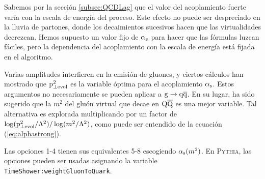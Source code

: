 Sabemos por la sección \ref{subsec:QCDLag} que el valor del acoplamiento fuerte varía con la escala de energía del proceso. Este efecto no puede ser despreciado en la lluvia de partones, donde los decaimientos sucesivos hacen que las virtualidades decrezcan. Hemos supuesto un valor fijo de $\alpha_{\mathrm{s}}$ para hacer que las fórmulas luzcan fáciles, pero la dependencia del acoplamiento con la escala de energía está fijada en el algoritmo.

Varias amplitudes interfieren en la emisión de gluones, y ciertos cálculos han mostrado que ${\mathrm p}^2_{\perp\mathrm{evol}}$ es la variable óptima para el acoplamiento $\alpha_{\mathrm{s}}$. Estos argumentos no necesariamente se pueden aplicar a ${\mathrm g}\to{\mathrm q}\overline{\mathrm q}$. En su lugar, ha sido sugerido que la $m^2$ del gluón virtual que decae en ${\mathrm Q}\overline{\mathrm Q}$ es una mejor variable. Tal alternativa es explorada multiplicando por un factor de $\log({\mathrm p}^2_{\perp\mathrm{evol}}/\Lambda^2)/\log(m^2/\Lambda^2)$, como puede ser entendido de la ecuación (\ref{eq:alphastrong}).

Las opciones 1-4 tienen sus equivalentes 5-8 escogiendo $\alpha_{\mathrm{s}}(m^2)$. En \textsc{Pythia}, las opciones pueden ser usadas asignando la variable \verb|TimeShower:weightGluonToQuark|.

